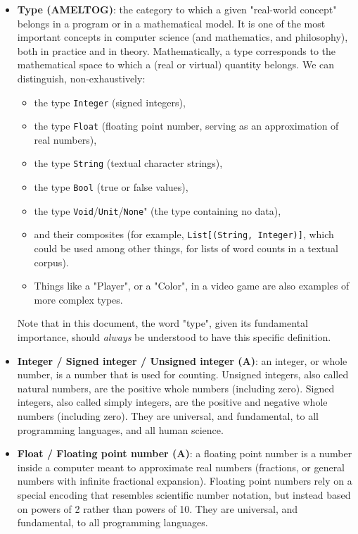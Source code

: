 \documentclass{article}
\begin{document}
\begin{itemize}
	\item \textbf{Type (AMELTOG)}: the category to which a given "real-world concept" belongs in a program or in a mathematical model. It is one of the most important concepts in computer science (and mathematics, and philosophy), both in practice and in theory. Mathematically, a type corresponds to the mathematical space to which a (real or virtual) quantity belongs. We can distinguish, non-exhaustively:
	\begin{itemize}
		\item the type \texttt{Integer} (signed integers),
		\item the type \texttt{Float} (floating point number, serving as an approximation of real numbers),
		\item the type \texttt{String} (textual character strings),
		\item the type \texttt{Bool} (true or false values),
		\item the type \texttt{Void}/\texttt{Unit}/\texttt{None}" (the type containing no data),
		\item and their composites (for example, \texttt{List[(String, Integer)]}, which could be used among other things, for lists of word counts in a textual corpus).
		\item Things like a "Player", or a "Color", in a video game are also examples of more complex types.
	\end{itemize}
	Note that in this document, the word "type", given its fundamental importance, should \textit{always} be understood to have this specific definition.

	\item \textbf{Integer / Signed integer / Unsigned integer (A)}: an integer, or whole number, is a number that is used for counting. Unsigned integers, also called natural numbers, are the positive whole numbers (including zero). Signed integers, also called simply integers, are the positive and negative whole numbers (including zero). They are universal, and fundamental, to all programming languages, and all human science.

	\item \textbf{Float / Floating point number (A)}: a floating point number is a number inside a computer meant to approximate real numbers (fractions, or general numbers with infinite fractional expansion). Floating point numbers rely on a special encoding that resembles scientific number notation, but instead based on powers of 2 rather than powers of 10. They are universal, and fundamental, to all programming languages.


\end{itemize}
\end{document}
